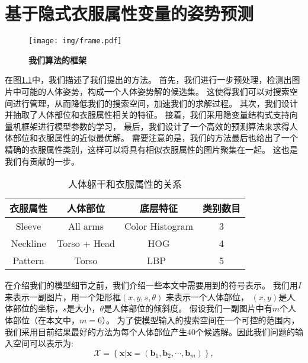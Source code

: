 
\chapter{基于隐式衣服属性变量的姿势预测}
\label{chap:model}

\begin{figure}[tbp]
\centering
\texttt{[image: img/frame.pdf]}
\caption{ \textbf{我们算法的框架} }
\label{fig:frame}
\end{figure}

在图\ref{fig:frame}中，我们描述了我们提出的方法。
首先，我们进行一步预处理，检测出图片中可能的人体姿势，构成一个人体姿势解的候选集。
这使得我们可以对搜索空间进行管理，从而降低我们的搜索空间，加速我们的求解过程。
其次，我们设计并抽取了人体部位和衣服属性相关的特征。
接着，我们采用隐变量结构式支持向量机框架进行模型参数的学习，
最后，我们设计了一个高效的预测算法来求得人体部位和衣服属性的近似最优解。
需要注意的是，我们的方法最后也给出了一个精确的衣服属性类别，这样可以将具有相似衣服属性的图片聚集在一起。
这也是我们有贡献的一步。


\begin{table}
\label{tb:attr}
\centering
\caption{人体躯干和衣服属性的关系}
\begin{tabular}{|c|c|c|c|} \hline
衣服属性& 人体部位& 底层特征& 类别数目\\ \hline
Sleeve &  All arms & Color Histogram & 3 \\ \hline
Neckline & Torso + Head & HOG & 4\\ \hline
 Pattern & Torso & LBP~\cite{lbp} & 5\\ \hline
\end{tabular}
\end{table}

在介绍我们的模型细节之前，我们介绍一些本文中需要用到的符号表示。
我们用$I$来表示一副图片，用一个矩形框$(x, y, s, \theta)$ 来表示一个人体部位，
$(x, y)$是人体部位的坐标，$s$是大小，$\theta$是人体部位的倾斜度。
假设我们一副图片中有$m$个人体部位（在本文中，$m = 6$）。
为了使模型输入的搜索空间在一个可控的范围内，我们采用目前结果最好的方法为每个人体部位产生40个候选解。因此我们问题的输入空间可以表示为:
\begin{equation}
    \mathcal{X} = \left\{ \mathbf{x}|\mathbf{x} = ( \mathbf{b}_1, \mathbf{b}_2, \cdots, \mathbf{b}_m ) \right\},
\end{equation}

